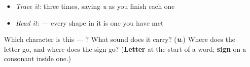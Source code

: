 \begin{itemize}
\raggedright
  \item \emph{Trace it:}  three times, saying \emph{u} as you finish each one
  \item \emph{Read it:}  — every shape in it is one you have met
\end{itemize}

\begin{tcolorbox}[breakable,colback=teal!4,colframe=teal!35!black,title={Before you move on}]
Which character is this — ? What sound does it carry? (\emph{\textbf{u}}.) Where does the letter go, and where does the sign  go? (\textbf{Letter} at the start of a word; \textbf{sign} on a consonant inside one.)
\end{tcolorbox}
